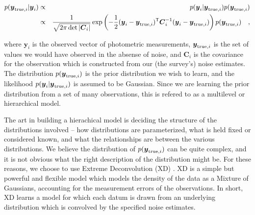 \documentclass[12pt,preprint]{aastex}
\newcommand{\datavector}[1]{\boldsymbol{#1}}
\newcommand{\data}{\datavector{y}}
\newcommand{\datum}{\data_i}
\newcommand{\truedatum}{\data_{{\rm true}, i}}
\newcommand{\datacov}{\datavector{C}}
\newcommand{\datumcov}{\datacov_i}
\newcommand{\transpose}{\mathsf{T}}
\begin{document}
\begin{eqnarray}\displaystyle
p(\truedatum | \datum) & \propto & p(\datum | \truedatum) p(\truedatum) \\
                                         & \propto & \frac{1}{\sqrt{2\pi\det{|\datumcov|}}} \exp \left (-\frac{1}{2}(\datum - \truedatum)^\transpose \datumcov^{-1}(\datum - \truedatum) \right ) p(\truedatum)
\quad ,
\label{eqn:posterior}
\end{eqnarray}

\noindent where $\datum$ is the observed vector of photometric measurements, 
$\truedatum$ is the set of values we would have observed in the absense of
noise, and $\datumcov$ is the covariance for the observation which is
constructed from our (the survey's) noise estimates.  The distribution 
$p(\truedatum)$ is the prior distribution we wish to learn, and the likelihood
$p(\datum | \truedatum)$ is assumed to be Gaussian.  Since we are learning the
prior distribution from a set of many observations, this is refered to as a
multilevel or hierarchical model.  

The art in building a hierachical model is deciding the structure of the
distributions involved -- how distributions are parameterized, what is held
fixed or considered known, and what the relationships are between the various
distributions.  We believe the distribution of $p(\truedatum)$ can be quite 
complex, and it is not obvious what the right description of the distribution
might be.  For these reasons, we choose to use Extreme Deconvolution (XD)
\citep{bovy11}.  XD is a simple but powerful and flexible model which models
the density of the data as a Mixture of Gaussians, accounting for the 
measurement errors of the observations.  In short, XD learns a model for which 
each datum is drawn from an underlying distribution which is convolved by the 
specified noise estimates.
\end{document}
